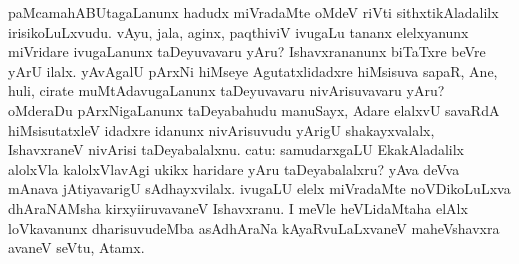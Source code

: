 
\begin{artha}
paMcamahABUtagaLanunx hadudx miVradaMte oMdeV riVti sithxtikAladalilx irisikoLuLxvudu. vAyu, jala, aginx, paqthiviV ivugaLu tananx elelxyanunx miVridare ivugaLanunx taDeyuvavaru yAru? Ishavxrananunx biTaTxre beVre yArU ilalx. yAvAgalU pArxNi hiMseye Agutatxlidadxre hiMsisuva sapaR, Ane, huli, cirate muMtAdavugaLanunx taDeyuvavaru nivArisuvavaru yAru? oMderaDu pArxNigaLanunx taDeyabahudu manuSayx, Adare elalxvU savaRdA hiMsisutatxleV idadxre idanunx nivArisuvudu yArigU shakayxvalalx, IshavxraneV nivArisi taDeyabalalxnu. catu: samudarxgaLU EkakAladalilx alolxVla kalolxVlavAgi ukikx haridare yAru taDeyabalalxru? yAva deVva mAnava jAtiyavarigU sAdhayxvilalx. ivugaLU elelx miVradaMte noVDikoLuLxva dhAraNAMsha kirxyiiruvavaneV Ishavxranu. I meVle heVLidaMtaha elAlx loVkavanunx dharisuvudeMba asAdhAraNa kAyaRvuLaLxvaneV maheVshavxra avaneV seVtu, Atamx.
\end{artha}


